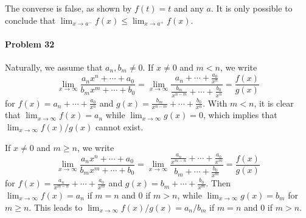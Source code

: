 \documentclass{article}
\begin{document}
The converse is false, as shown by $f(t) = t$ and any $a$. It is only possible
to conclude that $\lim_{x \to a^-} f(x) \leq \lim_{x \to a^+} f(x)$.

\paragraph{Problem 32} Naturally, we assume that $a_n, b_m \neq 0$. If $x \neq
0$ and $m < n$, we write \[
  \lim_{x \to \infty} \frac{a_nx^n + \cdots + a_0}{b_mx^m + \cdots + b_0}
  = \lim_{x \to \infty}
  \frac{a_n + \cdots + \frac{a_0}{x^n}}{\frac{b_m}{x^{n-m}} + \cdots +
  \frac{b_0}{x^n}}
  = \frac{f(x)}{g(x)}
\] for $f(x) = a_n + \cdots + \frac{a_0}{x^n}$ and $g(x) = \frac{b_m}{x^{n-m}}
+ \cdots + \frac{b_0}{x^n}$. With $m < n$, it is clear that
$\lim_{x \to \infty} f(x) = a_n$ while $\lim_{x \to \infty} g(x) = 0$, which
implies that $\lim_{x \to \infty} f(x)/g(x)$ cannot exist.

If $x \neq 0$ and $m \geq n$, we write \[
  \lim_{x \to \infty} \frac{a_nx^n + \cdots + a_0}{b_mx^m + \cdots + b_0}
  = \lim_{x \to \infty} \frac{\frac{a_n}{x^{m - n}} + \cdots +
  \frac{a_0}{x^m}}{b_m + \cdots + \frac{b_0}{x^m}}
  = \frac{f(x)}{g(x)}
\] for $f(x) = \frac{a_n}{x^{m - n}} + \cdots + \frac{a_0}{x^m}$ and $g(x) =
b_m + \cdots + \frac{b_0}{x^m}$. Then $\lim_{x \to \infty} f(x) = a_n$ if $m =
n$ and 0 if $m > n$, while $\lim_{x \to \infty} g(x) = b_m$ for $m \geq n$.
This leads to $\lim_{x \to \infty} f(x)/g(x) = a_n/b_m$ if $m = n$ and 0 if $m
> n$.
\end{document}
